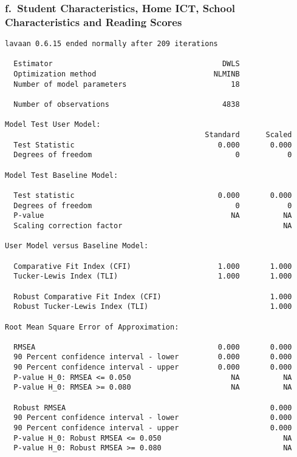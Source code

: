 \documentclass[
]{article}
\begin{document}
\hypertarget{f.-student-characteristics-home-ict-school-characteristics-and-reading-scores}{%
\subsubsection{f.~Student Characteristics, Home ICT, School
Characteristics and Reading
Scores}\label{f.-student-characteristics-home-ict-school-characteristics-and-reading-scores}}

\begin{verbatim}
lavaan 0.6.15 ended normally after 209 iterations

  Estimator                                       DWLS
  Optimization method                           NLMINB
  Number of model parameters                        18

  Number of observations                          4838

Model Test User Model:
                                              Standard      Scaled
  Test Statistic                                 0.000       0.000
  Degrees of freedom                                 0           0

Model Test Baseline Model:

  Test statistic                                 0.000       0.000
  Degrees of freedom                                 0           0
  P-value                                           NA          NA
  Scaling correction factor                                     NA

User Model versus Baseline Model:

  Comparative Fit Index (CFI)                    1.000       1.000
  Tucker-Lewis Index (TLI)                       1.000       1.000
                                                                  
  Robust Comparative Fit Index (CFI)                         1.000
  Robust Tucker-Lewis Index (TLI)                            1.000

Root Mean Square Error of Approximation:

  RMSEA                                          0.000       0.000
  90 Percent confidence interval - lower         0.000       0.000
  90 Percent confidence interval - upper         0.000       0.000
  P-value H_0: RMSEA <= 0.050                       NA          NA
  P-value H_0: RMSEA >= 0.080                       NA          NA
                                                                  
  Robust RMSEA                                               0.000
  90 Percent confidence interval - lower                     0.000
  90 Percent confidence interval - upper                     0.000
  P-value H_0: Robust RMSEA <= 0.050                            NA
  P-value H_0: Robust RMSEA >= 0.080                            NA


\end{verbatim}
\end{document}
